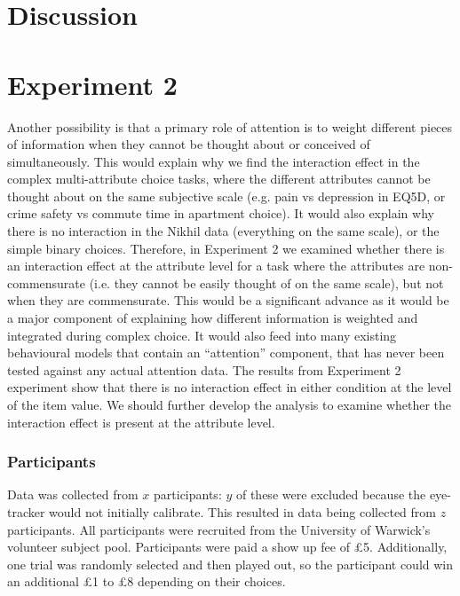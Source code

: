 \documentclass[doc, a4paper, apacite]{apa6}
\begin{document}


\section{Discussion}


\section{Experiment 2} \label{exp:NS07}
Another possibility is that a primary role of attention is to weight different pieces of information when they cannot be thought about or conceived of simultaneously. 
This would explain why we find the interaction effect in the complex multi-attribute choice tasks, where the different attributes cannot be thought about on the same subjective scale (e.g. pain vs depression in EQ5D, or crime safety vs commute time in apartment choice). 
It would also explain why there is no interaction in the Nikhil data (everything on the same scale), or the simple binary choices. 
Therefore, in Experiment 2 we examined whether there is an interaction effect at the attribute level for a task where the attributes are non-commensurate (i.e. they cannot be easily thought of on the same scale), but not when they are commensurate. 
This would be a significant advance as it would be a major component of explaining how different information is weighted and integrated during complex choice. 
It would also feed into many existing behavioural models that contain an “attention” component, that has never been tested against any actual attention data. 
The results from Experiment 2 experiment show that there is no interaction effect in either condition at the level of the item value. 
We should further develop the analysis to examine whether the interaction effect is present at the attribute level.
	
\subsubsection{Participants}
Data was collected from $x$ participants: $y$ of these were excluded because the eye-tracker would not initially calibrate. This resulted in data being collected from $z$ participants. All participants were recruited from the University of Warwick's volunteer subject pool. Participants were paid a show up fee of \pounds 5. Additionally, one trial was randomly selected and then played out, so the participant could win an additional \pounds 1 to \pounds 8 depending on their choices. 
\end{document}
